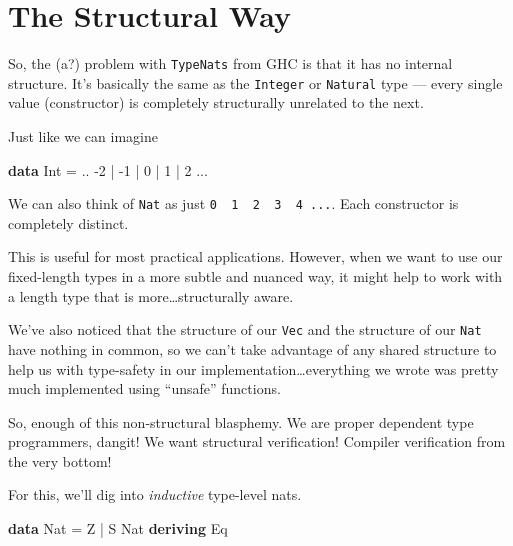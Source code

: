 \documentclass[]{article}
\newenvironment{Shaded}{}{}
\newcommand{\KeywordTok}[1]{\textcolor[rgb]{0.00,0.44,0.13}{\textbf{#1}}}
\newcommand{\DataTypeTok}[1]{\textcolor[rgb]{0.56,0.13,0.00}{#1}}
\newcommand{\DecValTok}[1]{\textcolor[rgb]{0.25,0.63,0.44}{#1}}
\newcommand{\FunctionTok}[1]{\textcolor[rgb]{0.02,0.16,0.49}{#1}}
\begin{document}
\section{The Structural Way}\label{the-structural-way}

So, the (a?) problem with \texttt{TypeNats} from GHC is that it has no internal
structure. It's basically the same as the \texttt{Integer} or \texttt{Natural}
type --- every single value (constructor) is completely structurally unrelated
to the next.

Just like we can imagine

\begin{Shaded}
\begin{Highlighting}[]
\KeywordTok{data} \DataTypeTok{Int} \FunctionTok{=} \FunctionTok{..} \FunctionTok{-}\DecValTok{2} \FunctionTok{|} \FunctionTok{-}\DecValTok{1} \FunctionTok{|} \DecValTok{0} \FunctionTok{|} \DecValTok{1} \FunctionTok{|} \DecValTok{2} \FunctionTok{...}
\end{Highlighting}
\end{Shaded}

We can also think of \texttt{Nat} as just
\texttt{0\ \textbar{}\ 1\ \textbar{}\ 2\ \textbar{}\ 3\ \textbar{}\ 4\ ...}.
Each constructor is completely distinct.

This is useful for most practical applications. However, when we want to use our
fixed-length types in a more subtle and nuanced way, it might help to work with
a length type that is more\ldots{}structurally aware.

We've also noticed that the structure of our \texttt{Vec} and the structure of
our \texttt{Nat} have nothing in common, so we can't take advantage of any
shared structure to help us with type-safety in our
implementation\ldots{}everything we wrote was pretty much implemented using
``unsafe'' functions.

So, enough of this non-structural blasphemy. We are proper dependent type
programmers, dangit! We want structural verification! Compiler verification from
the very bottom!

For this, we'll dig into \emph{inductive} type-level nats.

\begin{Shaded}
\begin{Highlighting}[]
\KeywordTok{data} \DataTypeTok{Nat} \FunctionTok{=} \DataTypeTok{Z} \FunctionTok{|} \DataTypeTok{S} \DataTypeTok{Nat}
  \KeywordTok{deriving} \DataTypeTok{Eq}
\end{Highlighting}
\end{Shaded}
\end{document}
